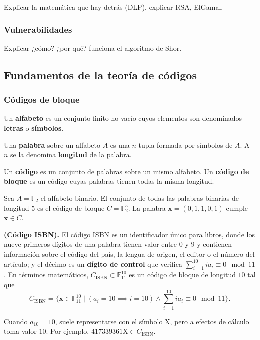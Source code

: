 Explicar la matemática que hay detrás (DLP), explicar RSA, ElGamal.

\subsubsection{Vulnerabilidades}

Explicar ¿cómo? ¿por qué? funciona el algoritmo de Shor.

\subsection{Fundamentos de la teoría de códigos}

\subsubsection{Códigos de bloque}

\begin{definition}
	Un \textbf{alfabeto} es un conjunto finito no vacío cuyos elementos son denominados \textbf{letras} o \textbf{símbolos}.
\end{definition}

\begin{definition}
	Una \textbf{palabra} sobre un alfabeto $A$ es una $n$-tupla formada por símbolos de $A$. A $n$ se la denomina \textbf{longitud} de la palabra.
\end{definition}

\begin{definition}
	Un \textbf{código} es un conjunto de palabras sobre un mismo alfabeto. Un \textbf{código de bloque} es un código cuyas palabras tienen todas la misma longitud.
\end{definition}

\begin{example}
	Sea $A = \mathbb{F}_2$ el alfabeto binario. El conjunto de todas las palabras binarias de longitud $5$ es el código de bloque $C = \mathbb{F}_2^5$. La palabra $\textbf{x} = (0, 1, 1, 0, 1)$ cumple $\textbf{x} \in C$.
\end{example}

\begin{example} \textbf{(Código ISBN).}
	El código ISBN es un identificador único para libros, donde los nueve primeros dígitos de una palabra tienen valor entre $0$ y $9$ y contienen información sobre el código del país, la lengua de origen, el editor o el número del artículo; y el décimo es un \textbf{dígito de control} que verifica $\sum_{i=1}^{10} ia_i \equiv 0 \mod 11$. En términos matemáticos, $C_{\textrm{ISBN}}\subset\mathbb{F}_{11}^{10}$ es un código de bloque de longitud $10$ tal que
	\[C_{\textrm{ISBN}} = \{\textbf{x}\in\mathbb{F}_{11}^{10} \mid (a_i = 10 \implies i = 10) \wedge \sum_{i=1}^{10}ia_i \equiv 0 \mod 11\}.\]
	\begin{remark}
		Cuando $a_{10} = 10$, suele representarse con el símbolo $\textrm{X}$, pero a efectos de cálculo toma valor $10$. Por ejemplo, $\textrm{417339361X} \in C_{\textrm{ISBN}}$.
	\end{remark}
\end{example}

